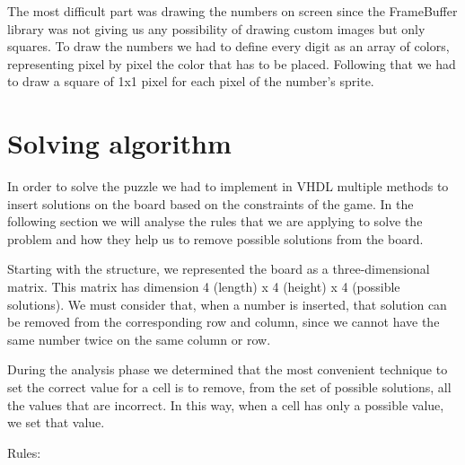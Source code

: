 \documentclass[12pt]{report}
\begin{document}
The most difficult part was drawing the numbers on screen since the
FrameBuffer library was not giving us any possibility of drawing custom
images but only squares. To draw the numbers we had to define every digit
as an array of colors, representing pixel by pixel the color that has to
be placed. Following that we had to draw a square of 1x1 pixel for each
pixel of the number's sprite.

\chapter*{Solving algorithm}

In order to solve the puzzle we had to implement in VHDL multiple methods
to insert solutions on the board based on the constraints of the game. In
the following section we will analyse the rules that we are applying to
solve the problem and how they help us to remove possible solutions from
the board.

Starting with the structure, we represented the board as
a three-dimensional matrix. This matrix has dimension 4 (length)
x 4 (height) x 4 (possible solutions). We must consider that, when
a number is inserted, that solution can be removed from the corresponding
row and column, since we cannot have the same number twice on the same
column or row.

During the analysis phase we determined that the most convenient technique
to set the correct value for a cell is to remove, from the set of possible
solutions, all the values that are incorrect. In this way, when a cell has
only a possible value, we set that value.

Rules:
\end{document}
